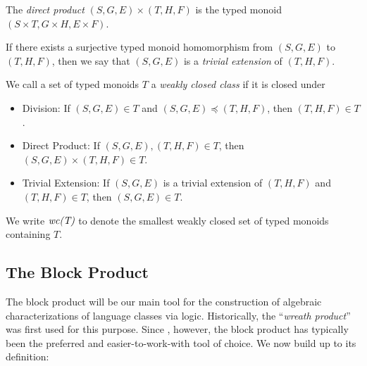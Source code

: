 \documentclass[a4paper,UKenglish,cleveref, autoref, thm-restate, anonymous]{lipics-v2021}
\begin{document}
\begin{definition}
    \item The \emph{direct product} $(S, G, E) \times (T, H, F)$ is the typed monoid $(S \times T, G \times H, E \times F)$.
\end{definition}

\begin{definition}
    If there exists a surjective typed monoid homomorphism from $(S, G, E)$ to $(T, H, F)$, then we say that $(S, G, E)$ is a \emph{trivial extension} of $(T, H, F)$.
\end{definition}


\begin{definition}
    We call a set of typed monoids $T$ a \emph{weakly closed class} if it is closed under
    \begin{itemize}
        \item Division: If $(S, G, E) \in T$ and $(S, G, E) \preceq (T, H, F)$, then $(T, H, F) \in T$.
        \item Direct Product: If $(S, G, E), (T, H, F) \in T$, then $(S, G, E) \times (T, H, F) \in T$.
        \item Trivial Extension: If $(S, G, E)$ is a trivial extension of $(T, H, F)$ and $(T, H, F) \in T$, then $(S, G, E) \in T$.
    \end{itemize}
    We write $\emph{wc(T)}$ to denote the smallest weakly closed set of typed monoids containing $T$.
\end{definition}


\subsection{The Block Product}
The block product will be our main tool for the construction of algebraic characterizations of language classes via logic. Historically, the ``\emph{wreath product}'' was first used for this purpose. Since \cite{rhodes1989kernel}, however, the block product has typically been the preferred and easier-to-work-with tool of choice. We now build up to its definition:
\end{document}
